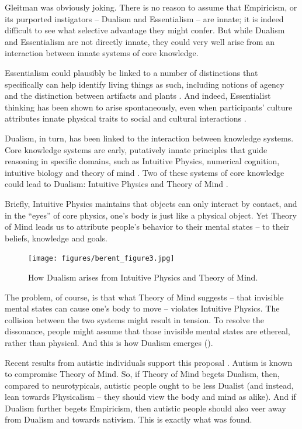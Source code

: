 \documentclass[output=paper,colorlinks,citecolor=brown
]{langscibook}
\begin{document}
Gleitman was obviously joking. There is no reason to assume that Empiricism, or its purported instigators -- Dualism and Essentialism -- are innate; it is indeed difficult to see what selective advantage they might confer. But while Dualism and Essentialism are not directly innate, they could very well arise from an interaction between innate systems of core knowledge.

Essentialism could plausibly be linked to a number of distinctions that specifically can help identify living things as such, including notions of agency \citep{setoh2013young} and the distinction between artifacts and plants \citep{wertz2014selective}. And indeed, Essentialist thinking has been shown to arise spontaneously, even when participants’ culture attributes innate physical traits to social and cultural interactions \citep{astuti2004constraints}.

Dualism, in turn, has been linked to the interaction between knowledge systems. Core knowledge systems are early, putatively innate principles that guide reasoning in specific domains, such as Intuitive Physics, numerical cognition, intuitive biology and theory of mind \citep{spelke2007core}. Two of these systems of core knowledge could lead to Dualism: Intuitive Physics and Theory of Mind \citep{bloom2005descartes}. 

Briefly, Intuitive Physics maintains that objects can only interact by contact, and in the “eyes” of core physics, one’s body is just like a physical object. Yet Theory of Mind leads us to attribute people’s behavior to their mental states -- to their beliefs, knowledge and goals. 

\begin{figure}
    \centering
    \texttt{[image: figures/berent\_figure3.jpg]}
    \caption{How Dualism arises from Intuitive Physics and Theory of Mind.}
    \label{fig:figure3}
\end{figure}

The problem, of course, is that what Theory of Mind suggests -- that invisible mental states can cause one’s body to move -- violates Intuitive Physics. The collision between the two systems might result in tension. To resolve the dissonance, people might assume that those invisible mental states are ethereal, rather than physical. And this is how Dualism emerges (). 

Recent results from autistic individuals support this proposal \citep{berent2022autism}. Autism is known to compromise Theory of Mind. So, if Theory of Mind begets Dualism, then, compared to neurotypicals, autistic people ought to be less Dualist (and instead, lean towards Physicalism -- they should view the body and mind as alike). And if Dualism further begets Empiricism, then autistic people should also veer away from Dualism and towards nativism. This is exactly what was found.
\end{document}
